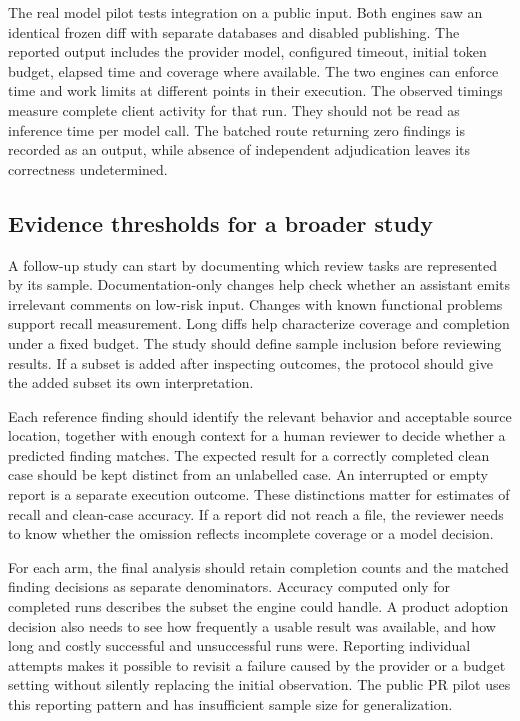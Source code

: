 \documentclass[journal,compsoc]{IEEEtran}
\begin{document}
The real model pilot tests integration on a public input. Both engines saw an identical frozen diff with separate databases and disabled publishing. The reported output includes the provider model, configured timeout, initial token budget, elapsed time and coverage where available. The two engines can enforce time and work limits at different points in their execution. The observed timings measure complete client activity for that run. They should not be read as inference time per model call. The batched route returning zero findings is recorded as an output, while absence of independent adjudication leaves its correctness undetermined.

\subsection{Evidence thresholds for a broader study}
A follow-up study can start by documenting which review tasks are represented by its sample. Documentation-only changes help check whether an assistant emits irrelevant comments on low-risk input. Changes with known functional problems support recall measurement. Long diffs help characterize coverage and completion under a fixed budget. The study should define sample inclusion before reviewing results. If a subset is added after inspecting outcomes, the protocol should give the added subset its own interpretation.

Each reference finding should identify the relevant behavior and acceptable source location, together with enough context for a human reviewer to decide whether a predicted finding matches. The expected result for a correctly completed clean case should be kept distinct from an unlabelled case. An interrupted or empty report is a separate execution outcome. These distinctions matter for estimates of recall and clean-case accuracy. If a report did not reach a file, the reviewer needs to know whether the omission reflects incomplete coverage or a model decision.

For each arm, the final analysis should retain completion counts and the matched finding decisions as separate denominators. Accuracy computed only for completed runs describes the subset the engine could handle. A product adoption decision also needs to see how frequently a usable result was available, and how long and costly successful and unsuccessful runs were. Reporting individual attempts makes it possible to revisit a failure caused by the provider or a budget setting without silently replacing the initial observation. The public PR pilot uses this reporting pattern and has insufficient sample size for generalization.
\end{document}
